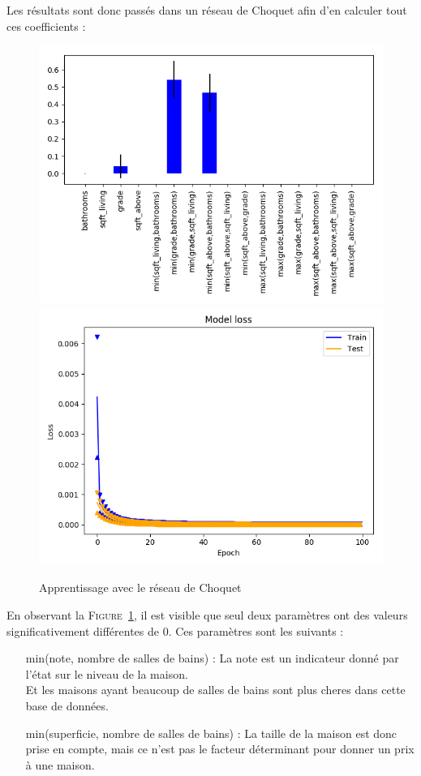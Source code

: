 Les résultats sont donc passés dans un réseau de Choquet afin d'en calculer tout ces coefficients :
\begin{figure}[H]
    \center
    \includegraphics[height=\moyen]{pict/real/netch.png}
    \includegraphics[height=\petit]{pict/real/learnch.png}
	\caption{Apprentissage avec le réseau de Choquet}
	\label{fig:real-Choquet}
\end{figure}

En observant la \textsc{Figure}\ \ref{fig:real-Choquet}, il est visible que seul deux paramètres
ont des valeurs significativement différentes de $0$.
Ces paramètres sont les suivants :
\begin{itemize}
    \item[min(note, nombre de salles de bains) :] La note est un indicateur donné par l'état sur le niveau de la maison.\\
        Et les maisons ayant beaucoup de salles de bains sont plus cheres dans cette base de données.
    \item[min(superficie, nombre de salles de bains) :] La taille de la maison est donc prise en compte,
        mais ce n'est pas le facteur déterminant pour donner un prix à une maison.
\end{itemize}



